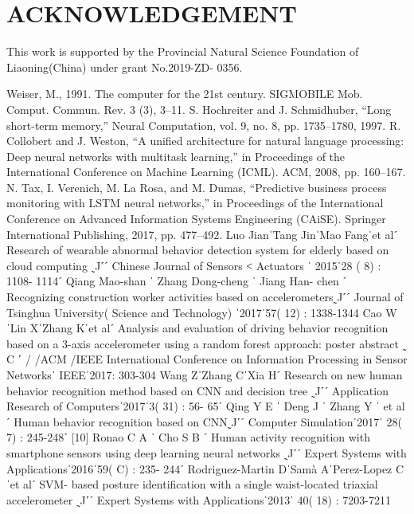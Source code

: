 \documentclass{article}
\begin{document}
\section{ACKNOWLEDGEMENT}
This work is supported by the Provincial Natural Science Foundation of Liaoning(China) under grant No.2019-ZD- 0356.   


\begin{thebibliography}{22}
\bibitem{}
Weiser, M., 1991. The computer for the 21st century. SIGMOBILE Mob. Comput. Commun. Rev. 3 (3), 3–11.
\bibitem{}
S. Hochreiter and J. Schmidhuber, “Long short-term memory,”
Neural Computation, vol. 9, no. 8, pp. 1735–1780, 1997.
\bibitem{}
	R. Collobert and J. Weston, “A unified architecture for natural language processing: Deep neural networks with multitask learning,” in Proceedings of the International Conference on Machine Learning (ICML). ACM, 2008, pp. 160–167.
	\bibitem{}
N. Tax, I. Verenich, M. La Rosa, and M. Dumas, “Predictive business process monitoring with LSTM neural networks,” in Proceedings of the International Conference on Advanced Information Systems Engineering (CAiSE). Springer International Publishing, 2017, pp. 477–492.
\bibitem{}
	Luo  JianˈTang  JinˈMao  Fangˈet  alˊ  Research  of  wearable abnormal behavior detection system for elderly based on cloud computing  ˷J˹ˊ  Chinese  Journal  of  Sensors  ˂   Actuators ˈ 2015ˈ28 ( 8) : 1108- 1114ˊ
\bibitem{}
	Qiang Mao-shan ˈ Zhang Dong-cheng ˈ Jiang Han- chen ˊ Recognizing construction worker activities based on accelerometers˷J˹ˊ Journal of Tsinghua University( Science and Technology) ˈ2017ˈ57( 12) : 1338-1344
	\bibitem{}
		Cao  WˈLin  XˈZhang  Kˈet  alˊ  Analysis  and  evaluation  of driving behavior recognition based on a 3-axis accelerometer using a random forest approach: poster abstract ˷ C ˹ / /ACM /IEEE International Conference on Information Processing in Sensor Networksˈ IEEEˈ2017: 303-304
	\bibitem{}
	Wang  ZˈZhang  CˈXia  Hˊ  Research  on  new  human  behavior recognition method based on CNN and decision tree
˷J˹ˊ  Application  Research  of  Computersˈ2017ˈ3(  31)  :  56- 65ˊ
\bibitem{}
	Qing Y E ˈ Deng J ˈ Zhang Y ˈ et al ˊ Human behavior recognition  based  on  CNN˷J˹ˊ  Computer  Simulationˈ2017ˈ 28( 7) : 245-248ˊ
\bibitem{}
[10]	Ronao C A ˈ Cho S B ˊ Human activity recognition with smartphone sensors using deep learning neural networks
˷J˹ˊ  Expert  Systems  with  Applicationsˈ2016ˈ59(  C)  :  235- 244ˊ
\bibitem{}
Rodriguez-Martin  DˈSamà  AˈPerez-Lopez  Cˈet  alˊ   SVM- based posture identification with a single waist-located triaxial accelerometer ˷J˹ˊ Expert Systems with Applicationsˈ2013ˈ 40( 18) : 7203-7211

\end{thebibliography}
\end{document}
